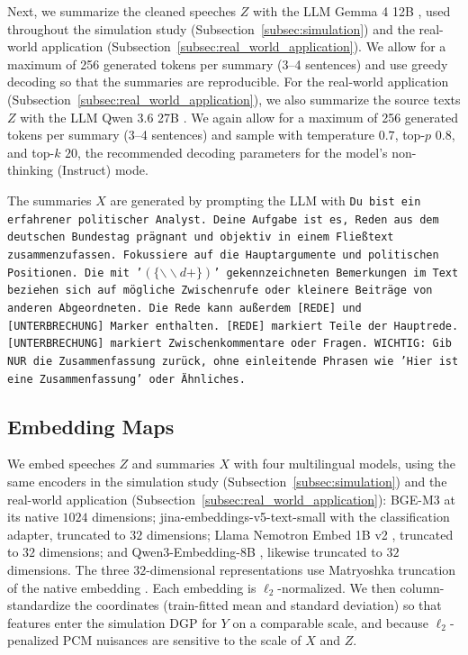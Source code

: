 \documentclass[twoside,11pt]{article}
\begin{document}
Next, we summarize the cleaned speeches $Z$ with the LLM Gemma 4 12B \citep{gemmateam2026gemma4}, used throughout the simulation study (Subsection~\ref{subsec:simulation}) and the real-world application (Subsection~\ref{subsec:real_world_application}). We allow for a maximum of 256 generated tokens per summary (3–4 sentences) and use greedy decoding so that the summaries are reproducible.
For the real-world application (Subsection~\ref{subsec:real_world_application}), we also summarize the source texts $Z$ with the LLM Qwen 3.6 27B \citep{qwen3.6-27b}. We again allow for a maximum of 256 generated tokens per summary (3–4 sentences) and sample with temperature $0.7$, top-$p$ $0.8$, and top-$k$ $20$, the recommended decoding parameters for the model’s non-thinking (Instruct) mode.

The summaries $X$ are generated by prompting the LLM with \texttt{Du bist ein erfahrener politischer Analyst. Deine Aufgabe ist es, Reden aus dem deutschen Bundestag prägnant und objektiv in einem Fließtext zusammenzufassen. Fokussiere auf die Hauptargumente und politischen Positionen.
Die mit '$(\{\backslash \backslash d+\})$' gekennzeichneten Bemerkungen im Text beziehen sich auf mögliche Zwischenrufe oder kleinere Beiträge von anderen Abgeordneten.
Die Rede kann außerdem [REDE] und [UNTERBRECHUNG] Marker enthalten. [REDE] markiert Teile der Hauptrede. [UNTERBRECHUNG] markiert Zwischenkommentare oder Fragen. WICHTIG: Gib NUR die Zusammenfassung zurück, ohne einleitende Phrasen wie 'Hier ist eine Zusammenfassung' oder Ähnliches.}

\subsection{Embedding Maps}\label{app:embedder_details}

We embed speeches $Z$ and summaries $X$ with four multilingual models, using the same encoders in the simulation study (Subsection~\ref{subsec:simulation}) and the real-world application (Subsection~\ref{subsec:real_world_application}): BGE-M3 \citep{chen2024m3} at its native $1024$ dimensions; jina-embeddings-v5-text-small \citep{akram2026jinaembeddingsv5texttasktargetedembeddingdistillation} with the classification adapter, truncated to $32$ dimensions; Llama Nemotron Embed 1B v2 \citep{nvidia_llama_nemotron_embed_1b_v2}, truncated to $32$ dimensions; and Qwen3-Embedding-8B \citep{qwen3embedding}, likewise truncated to $32$ dimensions.
The three $32$-dimensional representations use Matryoshka truncation of the native embedding \citep{kusupati2022matryoshka}. Each embedding is $\ell_2$-normalized. We then column-standardize the coordinates (train-fitted mean and standard deviation) so that features enter the simulation DGP for $Y$ on a comparable scale, and because $\ell_2$-penalized PCM nuisances are sensitive to the scale of $X$ and $Z$.
\end{document}
